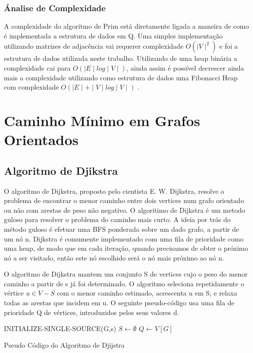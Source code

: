 \documentclass[a4paper,12pt]{article}
\begin{document}
\subsubsection{Ánalise de Complexidade}

A complexidade do algoritmo de Prim está diretamente ligada a maneira de como é implementada a estrutura de dados em Q. Uma simples implementação utilizando matrizes de adjacência vai requerer complexidade \emph{$O(\mid V\mid^2)$} e foi a estrutura de dados utilizada neste trabalho. Utilizando de uma heap binária a complexidade cai para \emph{$O(\mid E\mid log\mid V\mid)$}, ainda assim é possível decrescer ainda mais a complexidade utilizando como estrutura de dados uma Fibonacci Heap com complexidade \emph{$O(\mid E\mid+\mid V\mid log\mid V\mid)$} \cite{Cormem}.


\section{Caminho Mínimo em Grafos Orientados}

\subsection{Algoritmo de Djikstra}
O algoritmo de Dijkstra, proposto pelo cientista E. W. Dijkstra, resolve o problema de encontrar o menor caminho entre dois vertices num grafo orientado ou não com arestas de peso não negativo.
O algoritimo de Dijkstra é um metodo guloso para resolver o problema do caminho mais curto.
A ideia por trás do método guloso é efetuar uma BFS ponderada sobre um dado grafo, a partir de um nó n. Dijkstra é comumente implementado com uma fila de prioridade como uma heap, de modo que em cada iteração, quando precisamos de obter o próximo nó a ser visitado, então este nó escolhido será o nó mais próximo ao nó n.

O algoritmo de Dijkstra mantem um conjunto S de vertices cujo o peso do menor caminho a partir de s já foi determinado. O algoritmo seleciona repetidamente o vértice $u \in V - S$ com o menor caminho estimado, acrescenta u em S, e relaxa todas as arestas que incidem em u. O seguinte pseudo-código usa uma fila de prioridade Q  de vértices, introduzidos pelos seus valores d.

\begin{algorithm}[H]
\LinesNumbered
\SetAlgoLined
{}
INITIALIZE-SINGLE-SOURCE(G,s)\;
$ S \gets \emptyset $\;
$ Q \gets V[G] $\;
\caption{Pseudo Código do Algoritmo de Djijstra}
\end{algorithm}
\end{document}
